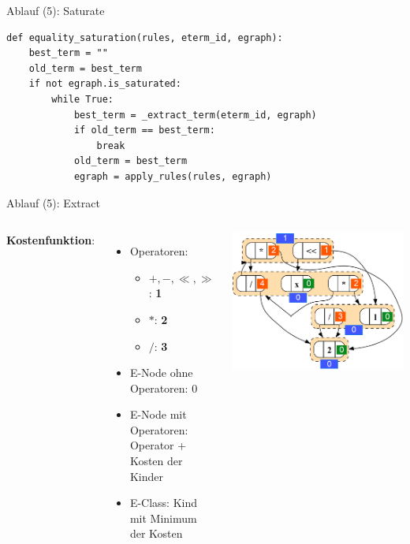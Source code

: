 \begin{frame}[fragile]{Ablauf (5): Saturate}
\begin{verbatim}    
def equality_saturation(rules, eterm_id, egraph):
    best_term = ""
    old_term = best_term
    if not egraph.is_saturated:
        while True:
            best_term = _extract_term(eterm_id, egraph)
            if old_term == best_term:
                break
            old_term = best_term
            egraph = apply_rules(rules, egraph)     
\end{verbatim}
\end{frame}

\begin{frame}{Ablauf (5): Extract}
    \begin{columns}[c]
            \textbf{Kostenfunktion}:
            \begin{itemize}
                \item Operatoren: \begin{itemize}
                    \item $+, -, \ll, \gg$: \textbf{1}
                    \item $*$: \textbf{2}
                    \item $/$: \textbf{3}
                \end{itemize}
                \item E-Node ohne Operatoren: \colorbox{green-400}{0}
                \item E-Node mit Operatoren: \colorbox{orange-400}{Operator + Kosten der Kinder}
                \item E-Class: \colorbox{blue-300}{Kind mit Minimum der Kosten}
            \end{itemize}
            
            \includegraphics[scale=0.3]{utils/exp_egraph_colored.png}
    \end{columns}
\end{frame}

